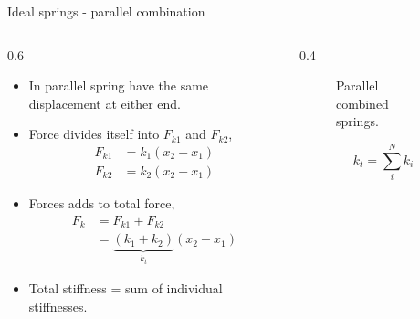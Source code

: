 \documentclass[11pt,aspectratio=169,handout]{beamer}
\begin{document}
\begin{frame}[c]{Ideal springs - parallel combination}
	\begin{columns}[T]
		\begin{column}{0.6\textwidth}
			\begin{itemize}
				\item In parallel spring have the same displacement at either end.
				\item Force divides itself into $F_{k1}$ and $F_{k2}$,
				\begin{align}
					F_{k1} &= k_1(x_2-x_1)\\
					F_{k2} &= k_2(x_2-x_1)
				\end{align}
			\item Forces adds to total force,
			\begin{align}
				F_k &= F_{k1}+F_{k2} \\
				&=\underbrace{(k_1+k_2)}_{k_t}(x_2-x_1)
			\end{align}
		\item Total stiffness = sum of individual stiffnesses.
			\end{itemize}
		\end{column}
		\begin{column}{0.4\textwidth}
			\begin{figure}
				\centering
				
				\caption{Parallel combined springs.}
			\end{figure}
		\vspace{0.5cm}
			\begin{equation}
				k_t = \sum_i^N k_i
			\end{equation}
		\end{column}
	\end{columns}
\end{frame}
\end{document}
